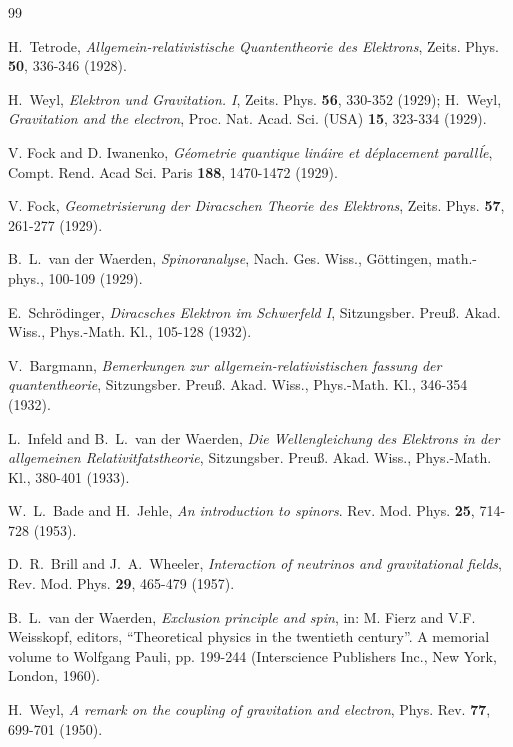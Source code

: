 \documentclass[preprint,showpacs,preprintnumbers,eqsecnum,amsmath,amssymb]{revtex4-1}
\begin{document}
\begin{thebibliography}{99}

H.~Tetrode, {\it Allgemein-relativistische Quantentheorie des Elektrons},
Zeits. Phys. {\bf 50}, 336-346 (1928). %

H.~Weyl, {\it Elektron und Gravitation. I},
Zeits. Phys. {\bf 56}, 330-352 (1929); %
H.~Weyl, {\it Gravitation and the electron},
Proc. Nat. Acad. Sci. (USA) {\bf 15}, 323-334 (1929). %

V. Fock and D. Iwanenko, {\it G\'eometrie quantique lin\'aire et d\'eplacement parall\'le},
Compt. Rend. Acad Sci. Paris {\bf 188}, 1470-1472 (1929). %

V. Fock, {\it Geometrisierung der Diracschen Theorie des Elektrons},
Zeits. Phys. {\bf 57}, 261-277 (1929). %

B.~L.~van der Waerden, {\it Spinoranalyse},
Nach. Ges. Wiss., G\"ottingen, math.-phys., 100-109 (1929). %

E.~Schr\"odinger, {\it Diracsches Elektron im Schwerfeld I},
Sitzungsber. Preu\ss. Akad. Wiss., Phys.-Math. Kl., 105-128 (1932). %

V.~Bargmann, {\it Bemerkungen zur allgemein-relativistischen fassung der quantentheorie},
Sitzungsber. Preu\ss. Akad. Wiss., Phys.-Math. Kl., 346-354 (1932). %

L.~Infeld and B.~L.~van der Waerden,
{\it Die Wellengleichung des Elektrons in der allgemeinen Relativitƒatstheorie},
Sitzungsber. Preu\ss. Akad. Wiss., Phys.-Math. Kl., 380-401 (1933). %

W.~L.~Bade and H.~Jehle, {\it An introduction to spinors}.
Rev. Mod. Phys. {\bf 25}, 714-728 (1953). %

D.~R.~Brill and J.~A.~Wheeler, {\it Interaction of neutrinos and gravitational fields},
Rev. Mod. Phys. {\bf 29}, 465-479 (1957). %

B.~L.~van der Waerden, {\it Exclusion principle and spin}, in: M. Fierz and V.F. Weisskopf,
editors, ``Theoretical physics in the twentieth century''. A memorial volume to Wolfgang Pauli,
pp. 199-244 (Interscience Publishers Inc., New York, London, 1960).

H.~Weyl, {\it A remark on the coupling of gravitation and electron},
Phys. Rev. {\bf 77}, 699-701 (1950). %


\end{thebibliography}
\end{document}
